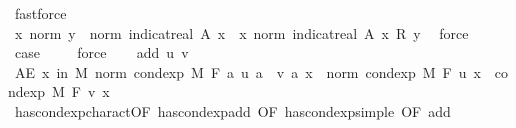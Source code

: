 \begin{isabellebody}
\ fastforce\isanewline
\ \ \isamarkupfalse%
\ \isamarkupfalse%
\ {\isachardoublequoteopen}{\isacharparenleft}{\kern0pt}{\isasymlambda}x{\isachardot}{\kern0pt}\ norm\ y\ {\isacharasterisk}{\kern0pt}\ norm\ {\isacharparenleft}{\kern0pt}indicat{\isacharunderscore}{\kern0pt}real\ A\ x{\isacharparenright}{\kern0pt}{\isacharparenright}{\kern0pt}\ {\isacharequal}{\kern0pt}\ {\isacharparenleft}{\kern0pt}{\isasymlambda}x{\isachardot}{\kern0pt}\ norm\ {\isacharparenleft}{\kern0pt}indicat{\isacharunderscore}{\kern0pt}real\ A\ x\ {\isacharasterisk}{\kern0pt}\isactrlsub R\ y{\isacharparenright}{\kern0pt}{\isacharparenright}{\kern0pt}{\isachardoublequoteclose}\ \isamarkupfalse%
\ force\isanewline
\ \ \isamarkupfalse%
\ \isamarkupfalse%
\ {\isacharquery}{\kern0pt}case\ \isamarkupfalse%
\ {\isacharasterisk}{\kern0pt}\ \isamarkupfalse%
\ force\isanewline
{}\isamarkupfalse%
\isanewline
\ \ \isamarkupfalse%
\ {\isacharparenleft}{\kern0pt}add\ u\ v{\isacharparenright}{\kern0pt}\isanewline
\ \ \isamarkupfalse%
\ {\isachardoublequoteopen}AE\ x\ in\ M{\isachardot}{\kern0pt}\ norm\ {\isacharparenleft}{\kern0pt}cond{\isacharunderscore}{\kern0pt}exp\ M\ F\ {\isacharparenleft}{\kern0pt}{\isasymlambda}a{\isachardot}{\kern0pt}\ u\ a\ {\isacharplus}{\kern0pt}\ v\ a{\isacharparenright}{\kern0pt}\ x{\isacharparenright}{\kern0pt}\ {\isacharequal}{\kern0pt}\ norm\ {\isacharparenleft}{\kern0pt}cond{\isacharunderscore}{\kern0pt}exp\ M\ F\ u\ x\ {\isacharplus}{\kern0pt}\ cond{\isacharunderscore}{\kern0pt}exp\ M\ F\ v\ x{\isacharparenright}{\kern0pt}{\isachardoublequoteclose}\ \isamarkupfalse%
\ has{\isacharunderscore}{\kern0pt}cond{\isacharunderscore}{\kern0pt}exp{\isacharunderscore}{\kern0pt}charact{\isacharparenleft}{\kern0pt}{}{\isacharparenright}{\kern0pt}{\isacharbrackleft}{\kern0pt}OF\ has{\isacharunderscore}{\kern0pt}cond{\isacharunderscore}{\kern0pt}exp{\isacharunderscore}{\kern0pt}add{\isacharcomma}{\kern0pt}\ OF\ has{\isacharunderscore}{\kern0pt}cond{\isacharunderscore}{\kern0pt}exp{\isacharunderscore}{\kern0pt}simple{\isacharparenleft}{\kern0pt}{}{\isacharcomma}{\kern0pt}{}{\isacharparenright}{\kern0pt}{\isacharcomma}{\kern0pt}\ OF\ add{\isacharparenleft}{\kern0pt}{}{\isacharcomma}{\kern0pt}{}{\isacharcomma}{\kern0pt}{}{\isacharcomma}{\kern0pt}{}{\isacharparenright}{\kern0pt}{\isacharbrackright}{\kern0pt}\ \isamarkupfalse%

\end{isabellebody}
